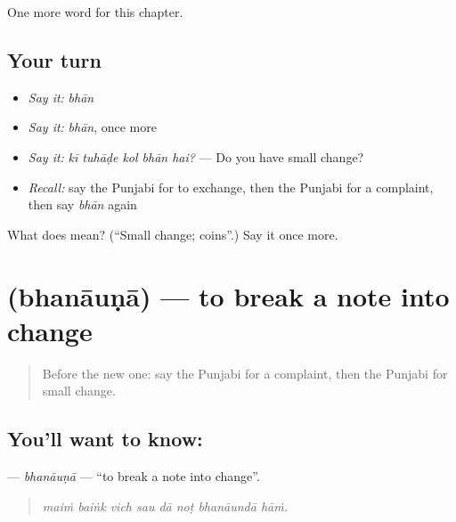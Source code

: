 \begin{grammarlens}[title={What you've built}]
One more word for this chapter.
\end{grammarlens}

\subsection*{Your turn}
\begin{itemize}
\raggedright
  \item \emph{Say it:} \emph{bhān}
  \item \emph{Say it:} \emph{bhān}, once more
  \item \emph{Say it:} \emph{kī tuhāḍe kol bhān hai?} — Do you have small change?
  \item \emph{Recall:} say the Punjabi for to exchange, then the Punjabi for a complaint, then say \emph{bhān} again
\end{itemize}

\begin{tcolorbox}[breakable,colback=teal!4,colframe=teal!35!black,title={Before you move on}]
What does  mean? (\textquotedblleft{}Small change; coins\textquotedblright{}.) Say it once more.
\end{tcolorbox}
\section[\texorpdfstring{\pa{ਭਨਾਉਣਾ} (bhanāuṇā)}{ਭਨਾਉਣਾ (bhanāuṇā)}]{ (bhanāuṇā) — to break a note into change}

\label{lesson:PA-C280-bhanauna}



\begin{quote}
Before the new one: say the Punjabi for a complaint, then the Punjabi for small change.
\end{quote}

\subsection*{You'll want to know: }
\textbf{} — \emph{bhanāuṇā} — \textquotedblleft{}to break a note into change\textquotedblright{}.

\begin{quote}
       
\end{quote}

\begin{quote}
\emph{maiṁ baiṅk vich sau dā noṭ bhanāundā hāṁ.}
\end{quote}

